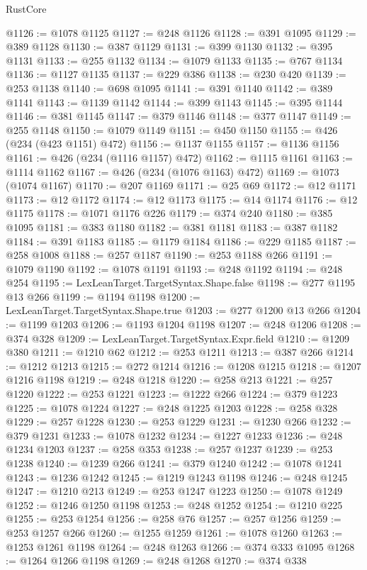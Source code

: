 \begin{lexlean}{RustCore}
\begin{coremodule}
@1126 := @1078 @1125
@1127 := @248 @1126
@1128 := @391 @1095
@1129 := @389 @1128
@1130 := @387 @1129
@1131 := @399 @1130
@1132 := @395 @1131
@1133 := @255 @1132
@1134 := @1079 @1133
@1135 := @767 @1134
@1136 := @1127 @1135
@1137 := @229 @386
@1138 := @230 @420
@1139 := @253 @1138
@1140 := @698 @1095
@1141 := @391 @1140
@1142 := @389 @1141
@1143 := @1139 @1142
@1144 := @399 @1143
@1145 := @395 @1144
@1146 := @381 @1145
@1147 := @379 @1146
@1148 := @377 @1147
@1149 := @255 @1148
@1150 := @1079 @1149
@1151 := @450 @1150
@1155 := @426 (@234 (@423 @1151) @472)
@1156 := @1137 @1155
@1157 := @1136 @1156
@1161 := @426 (@234 (@1116 @1157) @472)
@1162 := @1115 @1161
@1163 := @1114 @1162
@1167 := @426 (@234 (@1076 @1163) @472)
@1169 := @1073 (@1074 @1167)
@1170 := @207 @1169
@1171 := @25 @69
@1172 := @12 @1171
@1173 := @12 @1172
@1174 := @12 @1173
@1175 := @14 @1174
@1176 := @12 @1175
@1178 := @1071 @1176 @226
@1179 := @374 @240
@1180 := @385 @1095
@1181 := @383 @1180
@1182 := @381 @1181
@1183 := @387 @1182
@1184 := @391 @1183
@1185 := @1179 @1184
@1186 := @229 @1185
@1187 := @258 @1008
@1188 := @257 @1187
@1190 := @253 @1188 @266
@1191 := @1079 @1190
@1192 := @1078 @1191
@1193 := @248 @1192
@1194 := @248 @254
@1195 := LexLeanTarget.TargetSyntax.Shape.false
@1198 := @277 @1195 @13 @266
@1199 := @1194 @1198
@1200 := LexLeanTarget.TargetSyntax.Shape.true
@1203 := @277 @1200 @13 @266
@1204 := @1199 @1203
@1206 := @1193 @1204 @1198
@1207 := @248 @1206
@1208 := @374 @328
@1209 := LexLeanTarget.TargetSyntax.Expr.field
@1210 := @1209 @380
@1211 := @1210 @62
@1212 := @253 @1211
@1213 := @387 @266
@1214 := @1212 @1213
@1215 := @272 @1214
@1216 := @1208 @1215
@1218 := @1207 @1216 @1198
@1219 := @248 @1218
@1220 := @258 @213
@1221 := @257 @1220
@1222 := @253 @1221
@1223 := @1222 @266
@1224 := @379 @1223
@1225 := @1078 @1224
@1227 := @248 @1225 @1203
@1228 := @258 @328
@1229 := @257 @1228
@1230 := @253 @1229
@1231 := @1230 @266
@1232 := @379 @1231
@1233 := @1078 @1232
@1234 := @1227 @1233
@1236 := @248 @1234 @1203
@1237 := @258 @353
@1238 := @257 @1237
@1239 := @253 @1238
@1240 := @1239 @266
@1241 := @379 @1240
@1242 := @1078 @1241
@1243 := @1236 @1242
@1245 := @1219 @1243 @1198
@1246 := @248 @1245
@1247 := @1210 @213
@1249 := @253 @1247 @1223
@1250 := @1078 @1249
@1252 := @1246 @1250 @1198
@1253 := @248 @1252
@1254 := @1210 @225
@1255 := @253 @1254
@1256 := @258 @76
@1257 := @257 @1256
@1259 := @253 @1257 @266
@1260 := @1255 @1259
@1261 := @1078 @1260
@1263 := @1253 @1261 @1198
@1264 := @248 @1263
@1266 := @374 @333 @1095
@1268 := @1264 @1266 @1198
@1269 := @248 @1268
@1270 := @374 @338

\end{coremodule}
\end{lexlean}
